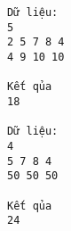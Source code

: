 \begin{verbatim}
Dữ liệu:
5
2 5 7 8 4
4 9 10 10 

Kết qủa
18

Dữ liệu:
4
5 7 8 4
50 50 50 

Kết qủa
24
\end{verbatim}